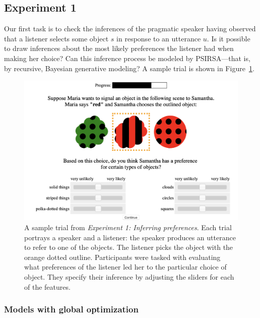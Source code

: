 \documentclass[10pt,a4paper]{article}
\begin{document}


\subsection*{Experiment 1}
Our first task is to check the inferences of the pragmatic speaker having observed that a listener selects some object $s$ in response to an utterance $u$. 
Is it possible to draw inferences about the most likely preferences the listener had when making her choice? 
Can this inference process be modeled by PSIRSA---that is, by recursive, Bayesian generative modeling?
A sample trial is shown in Figure~\ref{exp1-trial}.

\begin{figure}[ht!]
	\centering
	\includegraphics[width=4.5in]{images/preference-trial.png}
	\caption{ \small{A sample trial from \emph{Experiment 1: Inferring preferences}. Each trial portrays a speaker and a listener: the speaker produces an utterance to refer to one of the objects. The listener picks the object with the orange dotted outline. Participants were tasked with evaluating what preferences of the listener led her to the particular choice of object. They specify their inference by adjusting the sliders for each of the features}.}
	\label{exp1-trial}
\end{figure}

\subsubsection*{Models with global optimization}
\end{document}
